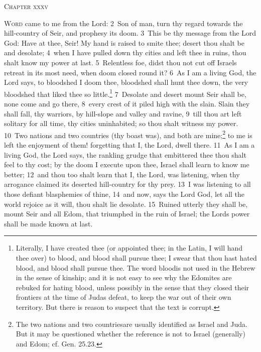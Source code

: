 \documentclass[10pt]{book} %
\begin{document}
\begin{large}\begin{center}\textsc{Chapter xxxv}\end{center}\end{large}
\lettrine[lines=2]{W}{ord} came to me from the Lord: \textcolor{benred8}{2}~Son of man, turn thy regard towards the hill-country of Seir, and prophesy its doom. \textcolor{benred8}{3}~This be thy message from the Lord God: Have at thee, Seir! My hand is raised to smite thee; desert thou shalt be and desolate; \textcolor{benred8}{4}~when I have pulled down thy cities and left thee in ruins, thou shalt know my power at last. \textcolor{benred8}{5}~Relentless foe, didst thou not cut off Israel\textquotesingle s retreat in its most need, when doom closed round it? \textcolor{benred8}{6}~As I am a living God, the Lord says, to bloodshed I doom thee, bloodshed shall hunt thee down, the very bloodshed that liked thee so little.\footnote[1]{Literally, \textasciigrave I have created thee (or appointed thee; in the Latin, I will hand thee over) to blood, and blood shall pursue thee; I swear that thou hast hated blood, and blood shall pursue thee\textquotesingle . The word \textasciigrave blood\textquotesingle  is not used in the Hebrew in the sense of \textasciigrave kinship\textquotesingle ; and it is not easy to see why the Edomites are rebuked for \textasciigrave hating blood\textquotesingle , unless possibly in the sense that they closed their frontiers at the time of Juda\textquotesingle s defeat, to keep the war out of their own territory. But there is reason to suspect that the text is corrupt.} \textcolor{benred8}{7}~Desolate and desert mount Seir shall be, none come and go there, \textcolor{benred8}{8}~every crest of it piled high with the slain. Slain they shall fall, thy warriors, by hill-slope and valley and ravine, \textcolor{benred8}{9}~till thou art left solitary for all time, thy cities uninhabited; so thou shalt witness my power. \textcolor{benred8}{10}~Two nations and two countries (thy boast was), and both are mine;\footnote[2]{The \textasciigrave two nations and two countries\textquotesingle  are usually identified as Israel and Juda. But it may be questioned whether the reference is not to Israel (generally) and Edom; cf. Gen. 25.23.} to me is left the enjoyment of them! forgetting that I, the Lord, dwell there. \textcolor{benred8}{11}~As I am a living God, the Lord says, the rankling grudge that embittered thee thou shalt feel to thy cost; by the doom I execute upon thee, Israel shall learn to know me better; \textcolor{benred8}{12}~and thou too shalt learn that I, the Lord, was listening, when thy arrogance claimed its deserted hill-country for thy prey. \textcolor{benred8}{13}~I was listening to all those defiant blasphemies of thine, \textcolor{benred8}{14}~and now, says the Lord God, let all the world rejoice as it will, thou shalt lie desolate. \textcolor{benred8}{15}~Ruined utterly they shall be, mount Seir and all Edom, that triumphed in the ruin of Israel; the Lord\textquotesingle s power shall be made known at last.
\end{document}
